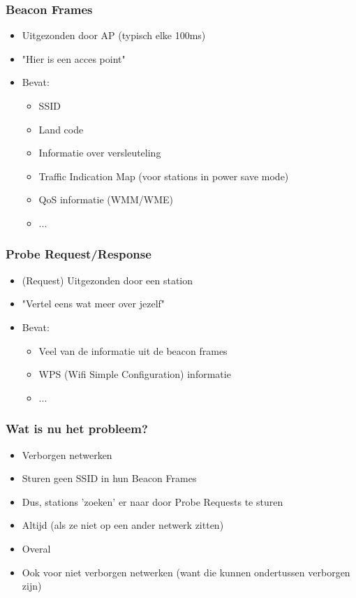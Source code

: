 \documentclass{beamer}
\begin{document}
  \begin{frame}
    \frametitle{Beacon Frames}
    \begin{itemize}
      \item Uitgezonden door AP (typisch elke 100ms)
      \item "Hier is een acces point"
      \item Bevat:
        \begin{itemize}
          \item SSID
          \item Land code
          \item Informatie over versleuteling
          \item Traffic Indication Map (voor stations in power save mode)
          \item QoS informatie (WMM/WME)
          \item ...
        \end{itemize}
    \end{itemize}
  \end{frame}

  \begin{frame}
    \frametitle{Probe Request/Response}
    \begin{itemize}
      \item (Request) Uitgezonden door een station
      \item "Vertel eens wat meer over jezelf"
      \item Bevat:
        \begin{itemize}
          \item Veel van de informatie uit de beacon frames
          \item WPS (Wifi Simple Configuration) informatie
          \item ...
        \end{itemize}
    \end{itemize}
  \end{frame}

  \begin{frame}
    \frametitle{Wat is nu het probleem?}

    \begin{itemize}
      \item Verborgen netwerken
      \item Sturen geen SSID in hun Beacon Frames
      \item Dus, stations 'zoeken' er naar door Probe Requests te sturen
        \pause
      \item Altijd (als ze niet op een ander netwerk zitten)
      \item Overal
        \pause
      \item Ook voor niet verborgen netwerken (want die kunnen ondertussen verborgen zijn)
    \end{itemize}
  \end{frame}
\end{document}
